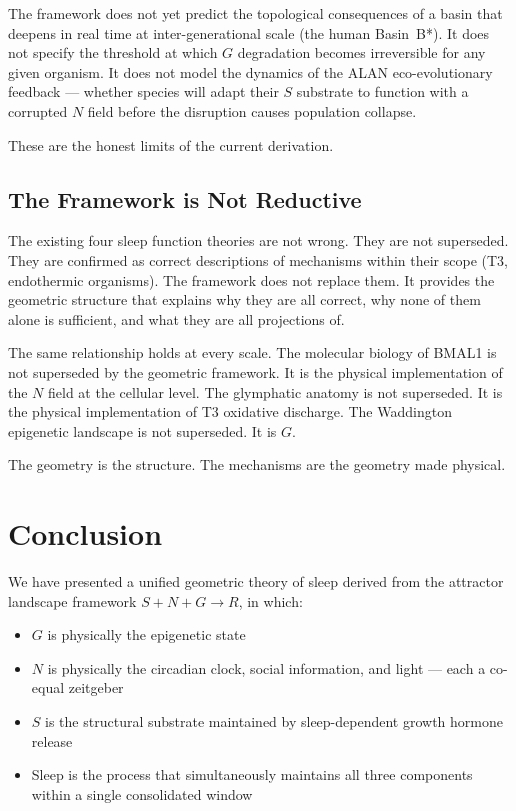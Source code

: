 \documentclass[10pt, a4paper]{article}
\begin{document}
The framework does not yet predict
the topological consequences of a basin
that deepens in real time at
inter-generational scale (the human
Basin~B*). It does not specify the
threshold at which $G$ degradation
becomes irreversible for any given
organism. It does not model the
dynamics of the ALAN eco-evolutionary
feedback --- whether species will
adapt their $S$ substrate to function
with a corrupted $N$ field before the
disruption causes population collapse.

These are the honest limits of the
current derivation.

\subsection{The Framework is Not
Reductive}

The existing four sleep function
theories are not wrong. They are not
superseded. They are confirmed as
correct descriptions of mechanisms
within their scope (T3, endothermic
organisms). The framework does not
replace them. It provides the geometric
structure that explains why they are
all correct, why none of them alone
is sufficient, and what they are
all projections of.

The same relationship holds at every
scale. The molecular biology of BMAL1
is not superseded by the geometric
framework. It is the physical
implementation of the $N$ field at the
cellular level. The glymphatic anatomy
is not superseded. It is the physical
implementation of T3 oxidative
discharge. The Waddington epigenetic
landscape is not superseded. It is $G$.

The geometry is the structure.
The mechanisms are the geometry
made physical.

\section{Conclusion}
\label{sec:conclusion}

We have presented a unified geometric
theory of sleep derived from the
attractor landscape framework
$S + N + G \rightarrow R$, in which:

\begin{itemize}[itemsep=0.2em]
  \item $G$ is physically the
    epigenetic state
  \item $N$ is physically the circadian
    clock, social information, and
    light --- each a co-equal zeitgeber
  \item $S$ is the structural substrate
    maintained by sleep-dependent growth
    hormone release
  \item Sleep is the process that
    simultaneously maintains all three
    components within a single
    consolidated window
\end{itemize}
\end{document}
